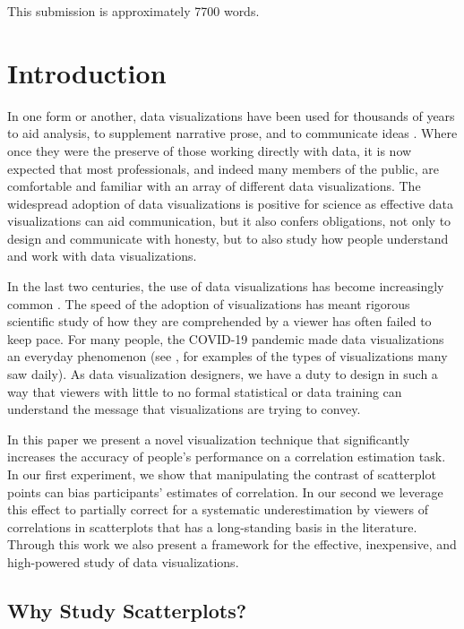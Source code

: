 \documentclass[preprint, 3p,
authoryear]{elsarticle} %
\begin{document}
This submission is approximately 7700 words.

\hypertarget{introduction}{%
\section{Introduction}\label{introduction}}

In one form or another, data visualizations have been used for thousands
of years to aid analysis, to supplement narrative prose, and to
communicate ideas \citep{azzam_2013}. Where once they were the preserve
of those working directly with data, it is now expected that most
professionals, and indeed many members of the public, are comfortable
and familiar with an array of different data visualizations. The
widespread adoption of data visualizations is positive for science as
effective data visualizations can aid communication, but it also confers
obligations, not only to design and communicate with honesty, but to
also study how people understand and work with data visualizations.

In the last two centuries, the use of data visualizations has become
increasingly common \citep{friendly_2005, azzam_2013}. The speed of the
adoption of visualizations has meant rigorous scientific study of how
they are comprehended by a viewer has often failed to keep pace. For
many people, the COVID-19 pandemic made data visualizations an everyday
phenomenon (see \citealp{bbc_2022}, for examples of the types of
visualizations many saw daily). As data visualization designers, we have
a duty to design in such a way that viewers with little to no formal
statistical or data training can understand the message that
visualizations are trying to convey.

In this paper we present a novel visualization technique that
significantly increases the accuracy of people's performance on a
correlation estimation task. In our first experiment, we show that
manipulating the contrast of scatterplot points can bias participants'
estimates of correlation. In our second we leverage this effect to
partially correct for a systematic underestimation by viewers of
correlations in scatterplots that has a long-standing basis in the
literature. Through this work we also present a framework for the
effective, inexpensive, and high-powered study of data visualizations.

\hypertarget{why-study-scatterplots}{%
\subsection{Why Study Scatterplots?}\label{why-study-scatterplots}}
\end{document}
